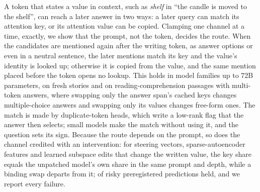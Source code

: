 

A token that states a value in context, such as \emph{shelf} in ``the candle is moved to the shelf'', can reach a later answer in two ways: a later query can match its attention key, or its attention value can be copied.
Clamping one channel at a time, exactly, we show that the prompt, not the token, decides the route.
When the candidates are mentioned again after the writing token, as answer options or even in a neutral sentence, the later mentions match its key and the value's identity is looked up; otherwise it is copied from the value, and the same mention placed before the token opens no lookup.
This holds in \nFamilies{} model families up to 72B parameters, on fresh stories and on reading-comprehension passages with multi-token answers, where swapping only the answer span's cached keys changes multiple-choice answers and swapping only its values changes free-form ones.
The match is made by duplicate-token heads, which write a low-rank flag that the answer then selects; small models make the match without using it, and the question sets its sign.
Because the route depends on the prompt, so does the channel credited with an intervention: for steering vectors, sparse-autoencoder features and learned subspace edits that change the written value, the key share equals the unpatched model's own share in the same prompt and depth, while a binding swap departs from it; \riskyMet{} of \riskyTotal{} risky preregistered predictions held, and we report every failure.

